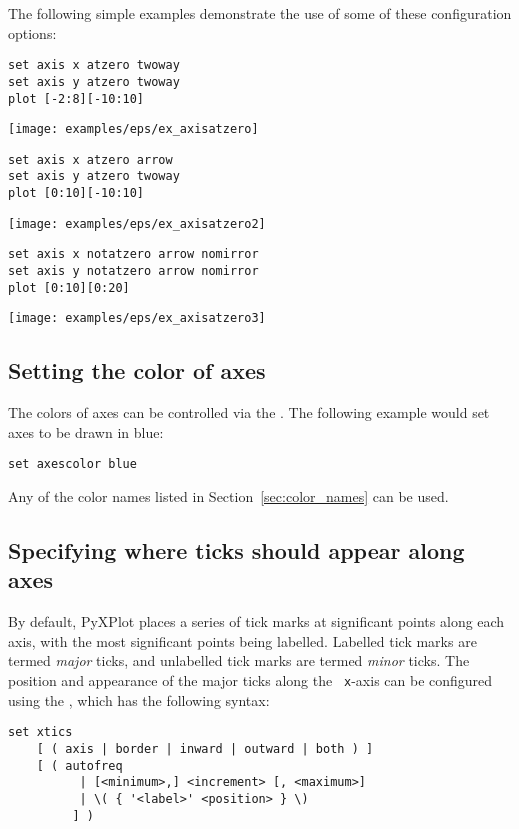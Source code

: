 The following simple examples demonstrate the use of some of these configuration options:
\begin{verbatim}
set axis x atzero twoway
set axis y atzero twoway
plot [-2:8][-10:10]
\end{verbatim}

\centerline{\texttt{[image: examples/eps/ex\_axisatzero]}}

\begin{verbatim}
set axis x atzero arrow
set axis y atzero twoway
plot [0:10][-10:10]
\end{verbatim}

\centerline{\texttt{[image: examples/eps/ex\_axisatzero2]}}

\begin{verbatim}
set axis x notatzero arrow nomirror
set axis y notatzero arrow nomirror
plot [0:10][0:20]
\end{verbatim}

\centerline{\texttt{[image: examples/eps/ex\_axisatzero3]}}

\subsection{Setting the color of axes}

The colors of axes can be controlled
via the .  The following example would set axes to be
drawn in blue:

\begin{verbatim}
set axescolor blue
\end{verbatim}

\noindent Any of the color names listed in Section~\ref{sec:color_names} can
be used.

\subsection{Specifying where ticks should appear along axes}

By default, PyXPlot places a series of tick marks at significant points along
each axis, with the most significant points being labelled.  Labelled tick
marks are termed {\it major} ticks, and unlabelled tick marks are termed {\it
minor} ticks.  The position and appearance of the major ticks along the {\tt
x}-axis can be configured using the , which has the
following syntax:

\begin{verbatim}
set xtics
    [ ( axis | border | inward | outward | both ) ]
    [ ( autofreq
          | [<minimum>,] <increment> [, <maximum>]
          | \( { '<label>' <position> } \)
         ] )
\end{verbatim}

